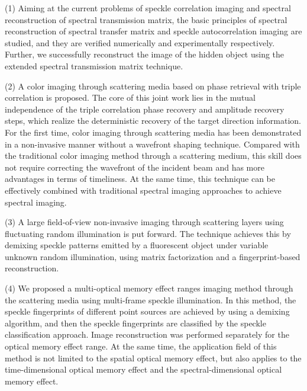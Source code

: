 \begin{englishabstract}
(1) Aiming at the current problems of speckle correlation imaging and spectral reconstruction of spectral transmission matrix, the basic principles of spectral reconstruction of spectral transfer matrix and speckle autocorrelation imaging are studied, and they are verified numerically and experimentally respectively. Further, we successfully reconstruct the image of the hidden object using the extended spectral transmission matrix technique.

(2) A color imaging through scattering media based on phase retrieval with triple correlation is proposed. The core of this joint work lies in the mutual independence of the triple correlation phase recovery and amplitude recovery steps, which realize the deterministic recovery of the target direction information. For the first time, color imaging through scattering media has been demonstrated in a non-invasive manner without a wavefront shaping technique. Compared with the traditional color imaging method through a scattering medium, this skill does not require correcting the wavefront of the incident beam and has more advantages in terms of timeliness. At the same time, this technique can be effectively combined with traditional spectral imaging approaches to achieve spectral imaging.

(3) A large field-of-view non-invasive imaging through scattering layers using fluctuating random illumination is put forward. The technique achieves this by demixing speckle patterns emitted by a fluorescent object under variable unknown random illumination, using matrix factorization and a fingerprint-based reconstruction.

(4) We proposed a multi-optical memory effect ranges imaging method through the scattering media using multi-frame speckle illumination. In this method, the speckle fingerprints of different point sources are achieved by using a demixing algorithm, and then the speckle fingerprints are classified by the speckle classification approach. Image reconstruction was performed separately for the optical memory effect range. At the same time, the application field of this method is not limited to the spatial optical memory effect, but also applies to the time-dimensional optical memory effect and the spectral-dimensional optical memory effect.
\\
 \\

\end{englishabstract}


